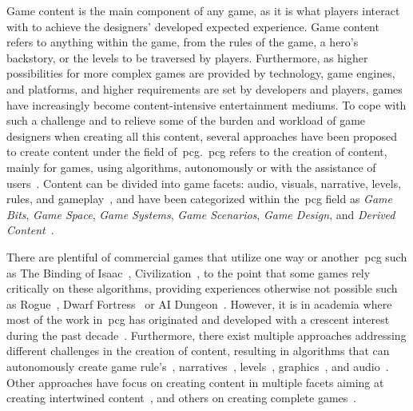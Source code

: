 
Game content is the main component of any game, as it is what players interact with to achieve the designers' developed expected experience. Game content refers to anything within the game, from the rules of the game, a hero's backstory, or the levels to be traversed by players. Furthermore, as higher possibilities for more complex games are provided by technology, game engines, and platforms, and higher requirements are set by developers and players, games have increasingly become content-intensive entertainment mediums. To cope with such a challenge and to relieve some of the burden and workload of game designers when creating all this content, several approaches have been proposed to create content under the field of~\acrlong{pcg}.~\acrshort{pcg} refers to the creation of content, mainly for games, using algorithms, autonomously or with the assistance of users~\cite{Yannakakis2018}. Content can be divided into game facets: audio, visuals, narrative, levels, rules, and gameplay~\cite{Liapis2019-OrchestratingGames}, and have been categorized within the~\acrshort{pcg} field as \textit{Game Bits}, \textit{Game Space}, \textit{Game Systems}, \textit{Game Scenarios}, \textit{Game Design}, and \textit{Derived Content}~\cite{Hendrikx2013-pcgSurvey}. 

There are plentiful of commercial games that utilize one way or another~\acrshort{pcg} such as The Binding of Isaac~\cite{bindingISAAC}, Civilization~\cite{civilization}, to the point that some games rely critically on these algorithms, providing experiences otherwise not possible such as Rogue~\cite{rogue}, Dwarf Fortress~\cite{dwarfFortress} or AI Dungeon~\cite{aidungeon}. However, it is in academia where most of the work in~\acrshort{pcg} has originated and developed with a crescent interest during the past decade~\cite{Liapis2020-pcgWorkshop}. Furthermore, there exist multiple approaches addressing different challenges in the creation of content, resulting in algorithms that can autonomously create game rule's~\cite{Browne2010-ludii,font2013-GenCardGames}, narratives~\cite{ashmore2007-questGeneratedWorld,ammanabrolu2019-towardQuestGeneration}, levels~\cite{Shaker2012EvolvingEvolution,sarkar2020-sequentialVAELVLGen,green2020-marioStitching}, graphics~\cite{Horsley2017-SpriteGenerator,Pagnutti2016-CreativeArtbot}, and audio~\cite{Scirea2016-MetaCompose,HooverPhD}. Other approaches have focus on creating content in multiple facets aiming at creating intertwined content~\cite{hoover2015-audioinspace,Cook2014-ARogueDream,Treanor2012Game-O-Matic:Ideas,Holtar2013Audioverdrive:Gameplay,karavolos2019multi}, and others on creating complete games~\cite{Browne2010-ludii,guzdial2020-conceptualGameExpansion,Cook2016-Angelina2}. 

